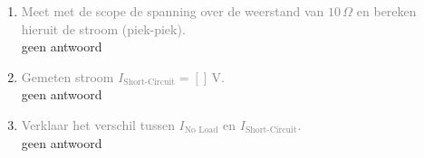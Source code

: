 \begin{enumerate}
    \item \textcolor{gray}{Meet met de scope de spanning over de weerstand van \(10 \, \Omega\) en bereken hieruit de stroom (piek-piek).}
    \\ geen antwoord
    
    \item \textcolor{gray}{Gemeten stroom \( I_{\text{Short-Circuit}} = [ ] \, \text{V} \).}
    \\ geen antwoord
    
    \item \textcolor{gray}{Verklaar het verschil tussen \( I_{\text{No Load}} \) en \( I_{\text{Short-Circuit}} \).}
    \\ geen antwoord
\end{enumerate}
